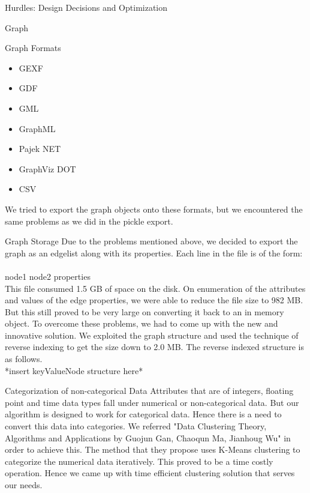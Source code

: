 \documentclass{report}
\begin{document}
\begin{projChapter}{Hurdles: Design Decisions and Optimization}
\begin{projSection}{Graph}
\begin{projSubSection}{Graph Formats}
\begin{itemize}
  \item GEXF
  \item GDF
  \item GML
  \item GraphML
  \item Pajek NET
  \item GraphViz DOT
  \item CSV
\end{itemize}

                We tried to export the graph objects onto these formats, but we encountered the same problems as we did in the pickle export.
            \end{projSubSection}
\begin{projSubSection}{Graph Storage}
                Due to the problems mentioned above, we decided to export the graph as an edgelist along with its properties. Each line in the file is of the form:
                ~\\
                node1 node2 properties
                ~\\
                This file consumed 1.5 GB of space on the disk. On enumeration of the attributes and values of the edge properties, we were able to reduce the file size to 982 MB. But this still proved to be very large on converting it back to an in memory object. To overcome these problems, we had to come up with the new and innovative solution. We exploited the graph structure and used the technique of reverse indexing to get the size down to 2.0 MB. The reverse indexed structure is as follows.
                ~\\
                *insert keyValueNode structure here*
            \end{projSubSection}
\end{projSection}
\begin{projSection}{Categorization of non-categorical Data}
            Attributes that are of integers, floating point and time data types fall under numerical or non-categorical data. But our algorithm is designed to work for categorical data. Hence there is a need to convert this data into categories. We referred "Data Clustering Theory, Algorithms and Applications by Guojun Gan, Chaoqun Ma, Jianhoug Wu" in order to achieve this. The method that they propose uses K-Means clustering to categorize the numerical data iteratively. This proved to be a time costly operation. Hence we came up with time efficient clustering solution that serves our needs.
        \end{projSection}

\end{projChapter}
\end{document}
